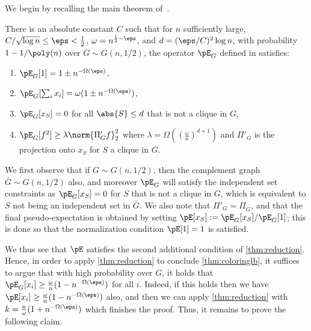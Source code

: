 We begin by recalling the main theorem of~\cite{DBLP:conf/focs/BarakHKKMP16}. 
\begin{theorem}
There is an absolute constant $C$ such that for $n$ sufficiently large, $C /\sqrt{\log n} \leq \eps < \frac{1}{2}$, $\omega = n^{\frac{1}{2} - \eps}$, and $d = (\eps/C)^2 \log n$,  with probability $1 - 1/\poly(n)$ over $G \sim G(n,1/2)$, the operator $\pE_{G}$ defined in \cite{DBLP:conf/focs/BarakHKKMP16} satisfies:
\begin{enumerate}
\item $\pE_G[1] = 1 \pm n^{-\Omega(\eps)}$,
\item $\pE_G[ \sum_{i} x_i] = \omega (1 \pm n^{-\Omega(\eps)})$,
\item $\pE_G[x_S] = 0$ for all $\abs{S} \leq d$ that is not a clique in $G$,
\item $\pE_G[f^2] \geq \lambda \norm{\Pi'_G f}_2^2$ where $\lambda = \Omega\left(\left(\frac{\omega}{n} \right)^{d + 1}\right)$ and $\Pi'_G$ is the projection onto $x_S$ for $S$ a clique in $G$.
\end{enumerate}
\end{theorem}
We first observe that if $G \sim G(n,1/2)$, then the complement graph $\bar{G} \sim G(n,1/2)$ also, and moreover $\pE_G$ will satisfy the independent set constraints as $\pE_G[x_S] = 0$ for $S$ that is not a clique in $G$, which is equivalent to $S$ not being an independent set in $\bar{G}$. We also note that $\Pi'_G = \Pi_{\bar{G}}$, and that the final pseudo-expectation is obtained by setting $\pE[x_S] := \pE_G[x_S]/\pE_G[1]$; this is done so that the normalization condition $\pE[1] = 1$ is satisfied. 

We thus see that $\pE$ satisfies the second additional condition of \cref{thm:reduction}. Hence, in order to apply \cref{thm:reduction} to conclude \cref{thm:coloringlb}, it suffices to argue that with high probability over $G$, it holds that $\pE_G[x_i] \geq \frac{\omega}{n}(1 - n^{-\Omega(\eps)})$ for all $i$. Indeed, if this holds then we have $\pE[x_i] \geq \frac{\omega}{n} (1 - n^{-\Omega(\eps)})$ also, and then we can apply \cref{thm:reduction} with $k = \frac{n}{\omega} (1 + n^{-\Omega(\eps)})$ which finishes the proof. Thus, it remains to prove the following claim.


